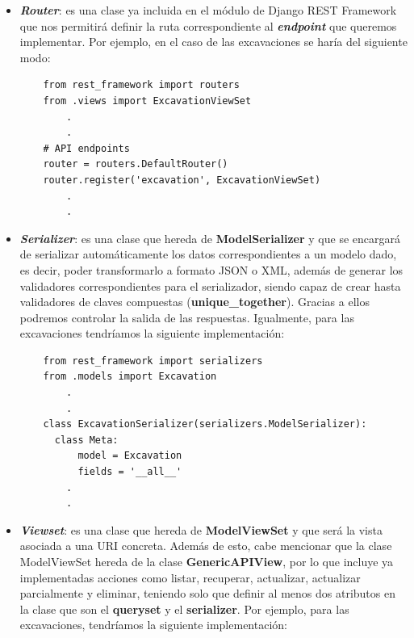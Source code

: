     \begin{itemize}
        \item \textbf{\textit{Router}}: es una clase ya incluida en el módulo de Django REST
        Framework que nos permitirá definir la ruta correspondiente al
        \textbf{\textit{endpoint}} que queremos implementar. Por ejemplo, en el caso de las
        excavaciones se haría del siguiente modo:
    
    \begin{verbatim}
    from rest_framework import routers
    from .views import ExcavationViewSet
        .
        .
    # API endpoints
    router = routers.DefaultRouter()
    router.register('excavation', ExcavationViewSet)
        .
        .
    \end{verbatim}

        \item \textbf{\textit{Serializer}}: es una clase que hereda de
        \textbf{ModelSerializer} y que se encargará de serializar automáticamente los datos
        correspondientes a un modelo dado, es decir, poder transformarlo a formato JSON o
        XML, además de generar los validadores correspondientes para el serializador, siendo
        capaz de crear hasta validadores de claves compuestas (\textbf{unique\_together}).
        Gracias a ellos podremos controlar la salida de las respuestas. Igualmente, para
        las excavaciones tendríamos la siguiente implementación:
    
    \newpage \begin{verbatim}
    from rest_framework import serializers
    from .models import Excavation
        .
        .
    class ExcavationSerializer(serializers.ModelSerializer):
      class Meta:
          model = Excavation
          fields = '__all__'
        .
        .
    \end{verbatim}

        \item \textbf{\textit{Viewset}}: es una clase que hereda de \textbf{ModelViewSet} y
        que será la vista asociada a una URI concreta. Además de esto, cabe mencionar que
        la clase ModelViewSet hereda de la clase \textbf{GenericAPIView}, por lo que
        incluye ya implementadas acciones como listar, recuperar, actualizar, actualizar
        parcialmente y eliminar, teniendo solo que definir al menos dos atributos en la
        clase que son el \textbf{queryset} y el \textbf{serializer}. Por ejemplo, para las
        excavaciones, tendríamos la siguiente implementación:
    

\end{itemize}
